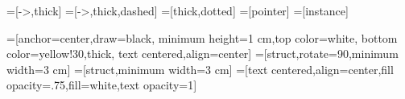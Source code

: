 =[->,thick]
=[->,thick,dashed]
=[thick,dotted]
=[pointer]
=[instance]

=[anchor=center,draw=black, minimum height=1 cm,top color=white, bottom color=yellow!30,thick, text centered,align=center]
=[struct,rotate=90,minimum width=3 cm]
=[struct,minimum width=3 cm]
=[text centered,align=center,fill opacity=.75,fill=white,text opacity=1]
